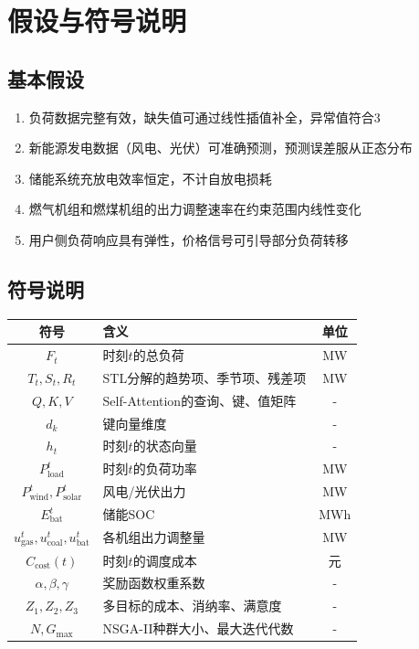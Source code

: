 \newpage
\section{假设与符号说明}

\subsection{基本假设}
\begin{enumerate}
    \item 负荷数据完整有效，缺失值可通过线性插值补全，异常值符合3
    \item 新能源发电数据（风电、光伏）可准确预测，预测误差服从正态分布
    \item 储能系统充放电效率恒定，不计自放电损耗
    \item 燃气机组和燃煤机组的出力调整速率在约束范围内线性变化
    \item 用户侧负荷响应具有弹性，价格信号可引导部分负荷转移
\end{enumerate}

\subsection{符号说明}
\begin{center}
\begin{tabular}{c l c}
\hline
符号 & 含义 & 单位 \\
\hline
$F_t$ & 时刻$t$的总负荷 & MW \\
$T_t, S_t, R_t$ & STL分解的趋势项、季节项、残差项 & MW \\
$Q, K, V$ & Self-Attention的查询、键、值矩阵 & - \\
$d_k$ & 键向量维度 & - \\
$h_t$ & 时刻$t$的状态向量 & - \\
$P_{\text{load}}^t$ & 时刻$t$的负荷功率 & MW \\
$P_{\text{wind}}^t, P_{\text{solar}}^t$ & 风电/光伏出力 & MW \\
$E_{\text{bat}}^t$ & 储能SOC & MWh \\
$u_{\text{gas}}^t, u_{\text{coal}}^t, u_{\text{bat}}^t$ & 各机组出力调整量 & MW \\
$C_{\text{cost}}(t)$ & 时刻$t$的调度成本 & 元 \\
$\alpha, \beta, \gamma$ & 奖励函数权重系数 & - \\
$Z_1, Z_2, Z_3$ & 多目标的成本、消纳率、满意度 & - \\
$N, G_{\max}$ & NSGA-II种群大小、最大迭代代数 & - \\
\hline
\end{tabular}
\end{center}
